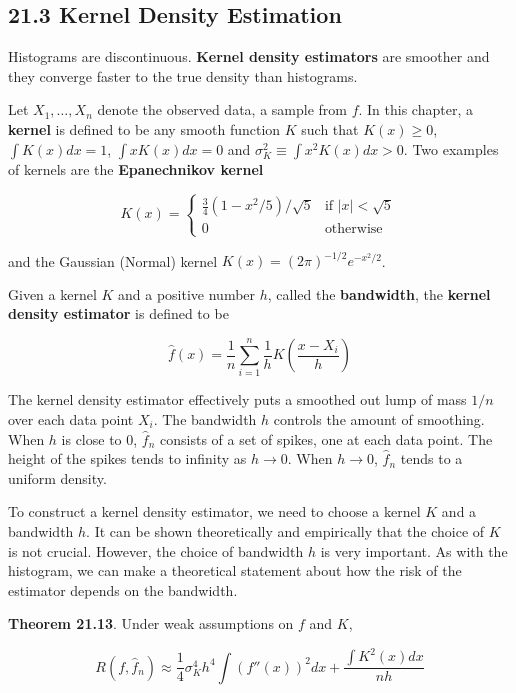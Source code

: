 \subsection*{21.3 Kernel Density Estimation}\label{kernel-density-estimation}

Histograms are discontinuous. \textbf{Kernel density estimators} are
smoother and they converge faster to the true density than histograms.

Let \(X_{1}, \dots, X_{n}\) denote the observed data, a sample from \(f\).
In this chapter, a \textbf{kernel} is defined to be any smooth function
\(K\) such that \(K(x) \geq 0\), \(\int K(x) dx = 1\),
\(\int x K(x) dx = 0\) and \(\sigma_K^{2} \equiv \int x^{2} K(x) dx > 0\).
Two examples of kernels are the \textbf{Epanechnikov kernel}

\[ K(x) = \begin{cases}
\frac{3}{4} \left(1 - x^{2} / 5 \right) / \sqrt{5} & \text{if } |x| < \sqrt{5} \\
0 & \text{otherwise}
\end{cases}\]

and the Gaussian (Normal) kernel \(K(x) = (2\pi)^{-1/2} e^{-x^{2}/2}\).

Given a kernel \(K\) and a positive number \(h\), called the
\textbf{bandwidth}, the \textbf{kernel density estimator} is defined to
be

\[ \hat{f}(x) = \frac{1}{n} \sum_{i=1}^{n} \frac{1}{h} K \left( \frac{x - X_{i}}{h} \right) \]

The kernel density estimator effectively puts a smoothed out lump of
mass \(1 / n\) over each data point \(X_{i}\). The bandwidth \(h\)
controls the amount of smoothing. When \(h\) is close to 0,
\(\hat{f}_{n}\) consists of a set of spikes, one at each data point. The
height of the spikes tends to infinity as \(h \rightarrow 0\). When
\(h \rightarrow 0\), \(\hat{f}_{n}\) tends to a uniform density.

To construct a kernel density estimator, we need to choose a kernel
\(K\) and a bandwidth \(h\). It can be shown theoretically and
empirically that the choice of \(K\) is not crucial. However, the choice
of bandwidth \(h\) is very important. As with the histogram, we can make
a theoretical statement about how the risk of the estimator depends on
the bandwidth.

\textbf{Theorem 21.13}. Under weak assumptions on \(f\) and \(K\),

\[ R(f, \hat{f}_{n}) \approx \frac{1}{4} \sigma_K^{4} h^{4} \int \left(f''(x)\right)^{2} dx + \frac{\int K^{2}(x) dx}{nh} \]


